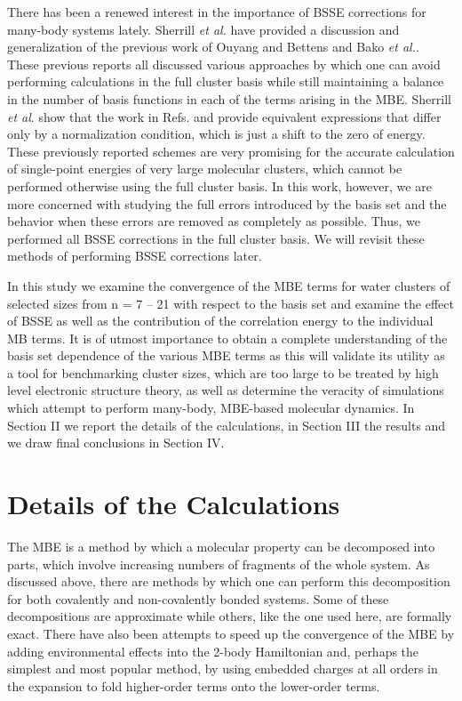 \documentclass[11pt, proquest]{uwthesis}[2020/02/24]
\begin{document}
\par There has been a renewed interest in the importance of BSSE corrections for many-body systems lately. Sherrill \textit{et al.}\autocite{richard_understanding_2018} have provided a discussion and generalization of the previous work of Ouyang and Bettens\autocite{ouyang_many-body_2015} and Bako \textit{et al.}\autocite{mayer_many-body_2017}. These previous reports all discussed various approaches by which one can avoid performing calculations in the full cluster basis while still maintaining a balance in the number of basis functions in each of the terms arising in the MBE. Sherrill \textit{et al}. show that the work in Refs. \cite{ouyang_many-body_2015} and \cite{mayer_many-body_2017} provide equivalent expressions that differ only by a normalization condition, which is just a shift to the zero of energy. These previously reported schemes are very promising for the accurate calculation of single-point energies of very large molecular clusters, which cannot be performed otherwise using the full cluster basis. In this work, however, we are more concerned with studying the full errors introduced by the basis set and the behavior when these errors are removed as completely as possible. Thus, we performed all BSSE corrections in the full cluster basis. We will revisit these methods of performing BSSE corrections later. 
\par In this study we examine the convergence of the MBE terms for water clusters of selected sizes from n = 7 – 21 with respect to the basis set and examine the effect of BSSE as well as the contribution of the correlation energy to the individual MB terms. It is of utmost importance to obtain a complete understanding of the basis set dependence of the various MBE terms as this will validate its utility as a tool for benchmarking cluster sizes, which are too large to be treated by high level electronic structure theory,\autocite{richard_aiming_2014} as well as determine the veracity of simulations which attempt to perform many-body, MBE-based molecular dynamics.\autocite{liu_hydrogen-bond_2018} In Section II we report the details of the calculations, in Section III the results and we draw final conclusions in Section IV.

\section{Details of the Calculations}

\par The MBE is a method by which a molecular property can be decomposed into parts, which involve increasing numbers of fragments of the whole system. As discussed above, there are methods by which one can perform this decomposition for both covalently and non-covalently bonded systems. Some of these decompositions are approximate while others, like the one used here, are formally exact. There have also been attempts to speed up the convergence of the MBE by adding environmental effects into the 2-body Hamiltonian\autocite{gordon_effective_2001} and, perhaps the simplest and most popular method, by using embedded charges at all orders in the expansion to fold higher-order terms onto the lower-order terms.\autocite{dahlke_electrostatically_2007}
\end{document}
